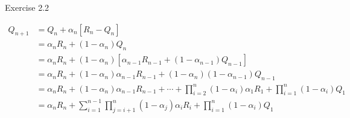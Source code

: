 Exercise 2.2

\begin{align*}
Q_{n+1} &= Q_n + \alpha_n[R_n-Q_n] \\
&= \alpha_nR_n + (1-\alpha_n)Q_n \\
&= \alpha_nR_n + (1-\alpha_n)[\alpha_{n-1}R_{n-1} + (1-\alpha_{n-1})Q_{n-1}] \\
&= \alpha_nR_n + (1-\alpha_n)\alpha_{n-1}R_{n-1} + (1-\alpha_n)(1-\alpha_{n-1})Q_{n-1} \\
&= \alpha_nR_n + (1-\alpha_n)\alpha_{n-1}R_{n-1} + \cdots + \prod_{i=2}^{n}(1-\alpha_i)\alpha_1R_1 + \prod_{i=1}^{n}(1-\alpha_i)Q_1 \\
&= \alpha_nR_n + \sum_{i=1}^{n-1}\prod_{j=i+1}^{n}(1-\alpha_j)\alpha_iR_i + \prod_{i=1}^{n}(1-\alpha_i)Q_1
\end{align*}

